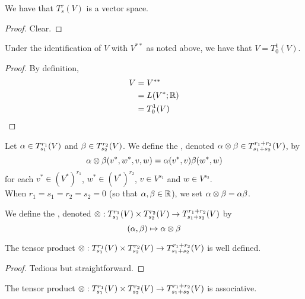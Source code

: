 \documentclass{book}
\begin{document}
	\begin{ex}
		We have that $T^r_s(V)$ is a vector space. 
	\end{ex}

	\begin{proof}
		Clear.
	\end{proof}
	
	\begin{ex}
	Under the identification of $V$ with $V^{**}$ as noted above, we have that $V = T^1_0(V)$. 
	\end{ex}
	
	\begin{proof}
	By definition,
	\begin{align*}
	V 
	&= V^{**} \\
	&= L(V^*; \mathbb{R}) \\
	&= T^1_0(V)
	\end{align*}
	\end{proof}
	
	\begin{defn}
	Let $\alpha \in T^{r_{1}}_{s_{1}}(V)$ and $\beta \in T^{r_{2}}_{s_{2}}(V)$. We define the , denoted $\alpha \otimes \beta \in T^{r_1+r_2}_{s_1+s_2}(V)$, by $$\alpha \otimes \beta (v^*, w^*, v, w) = \alpha(v^*, v) \beta(w^*, w)$$ for each $v^* \in (V^*)^{r_1}$, $w^* \in (V^*)^{r_2}$, $v \in V^{s_1}$ and $w \in V^{s_2}$.\\
	When $r_1=s_1=r_2=s_2= 0$ (so that $\alpha, \beta \in \mathbb{R}$), we set $\alpha \otimes \beta = \alpha \beta$.
	\end{defn}
	
	\begin{defn}
	We define the , denoted $\otimes : T^{r_{1}}_{s_{1}}(V) \times  T^{r_{2}}_{s_{2}}(V) \rightarrow T^{r_1 + r_2}_{s_1 + s_2}(V)$ by $$(\alpha, \beta) \mapsto \alpha \otimes \beta $$   
	\end{defn}
	
	\begin{ex}
	The tensor product $\otimes : T^{r_{1}}_{s_{1}}(V) \times  T^{r_{2}}_{s_{2}}(V) \rightarrow T^{r_1 + r_2}_{s_1 + s_2}(V)$ is well defined. 
	\end{ex}
	
	\begin{proof}
	Tedious but straightforward.
\end{proof}	
	
	\begin{ex}
	The tensor product $\otimes : T^{r_{1}}_{s_{1}}(V) \times  T^{r_{2}}_{s_{2}}(V) \rightarrow T^{r_1 + r_2}_{s_1 + s_2}(V)$ is associative. 
	\end{ex}
	
\end{document}
